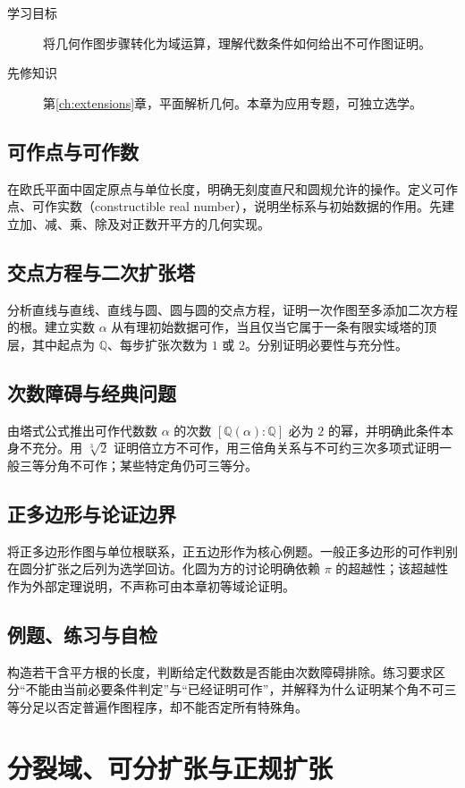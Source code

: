 \documentclass[UTF8,12pt,a4paper,fontset=fandol]{ctexbook}
\begin{document}
\begin{description}
  \item[学习目标] 将几何作图步骤转化为域运算，理解代数条件如何给出不可作图证明。
  \item[先修知识] 第\ref{ch:extensions}章，平面解析几何。本章为应用专题，可独立选学。
\end{description}

\section{可作点与可作数}
在欧氏平面中固定原点与单位长度，明确无刻度直尺和圆规允许的操作。定义可作点、可作实数（constructible real number），说明坐标系与初始数据的作用。先建立加、减、乘、除及对正数开平方的几何实现。

\section{交点方程与二次扩张塔}
分析直线与直线、直线与圆、圆与圆的交点方程，证明一次作图至多添加二次方程的根。建立实数 $\alpha$ 从有理初始数据可作，当且仅当它属于一条有限实域塔的顶层，其中起点为 $\mathbb Q$、每步扩张次数为 $1$ 或 $2$。分别证明必要性与充分性。

\section{次数障碍与经典问题}
由塔式公式推出可作代数数 $\alpha$ 的次数 $[\mathbb Q(\alpha):\mathbb Q]$ 必为 $2$ 的幂，并明确此条件本身不充分。用 $\sqrt[3]{2}$ 证明倍立方不可作，用三倍角关系与不可约三次多项式证明一般三等分角不可作；某些特定角仍可三等分。

\section{正多边形与论证边界}
将正多边形作图与单位根联系，正五边形作为核心例题。一般正多边形的可作判别在圆分扩张之后列为选学回访。化圆为方的讨论明确依赖 $\pi$ 的超越性；该超越性作为外部定理说明，不声称可由本章初等域论证明。

\section{例题、练习与自检}
构造若干含平方根的长度，判断给定代数数是否能由次数障碍排除。练习要求区分“不能由当前必要条件判定”与“已经证明可作”，并解释为什么证明某个角不可三等分足以否定普遍作图程序，却不能否定所有特殊角。

\chapter{分裂域、可分扩张与正规扩张}\label{ch:splitting}
\end{document}
